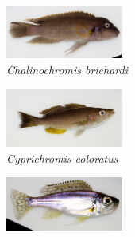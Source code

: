 
\newcommand{\fishfigwidth}{1.52in}

\begin{figure}
    \centering
    \begin{subfigure}[t]{\fishfigwidth}
        \includegraphics[width=\fishfigwidth]{FishPoo/figures/host_phenotypes/Chalinochromis_brichardi}
        \small
        \caption{\textit{Chalinochromis brichardi}}
    \end{subfigure}
    \begin{subfigure}[t]{\fishfigwidth}
        \includegraphics[width=\fishfigwidth]{FishPoo/figures/host_phenotypes/Cyprichromis_coloratus}
        \small
        \caption{\textit{Cyprichromis coloratus}}
    \end{subfigure}
    \begin{subfigure}[t]{\fishfigwidth}
        \includegraphics[width=\fishfigwidth]{FishPoo/figures/host_phenotypes/Haplotaxodon_microlepis}

\end{subfigure}
\end{figure}
